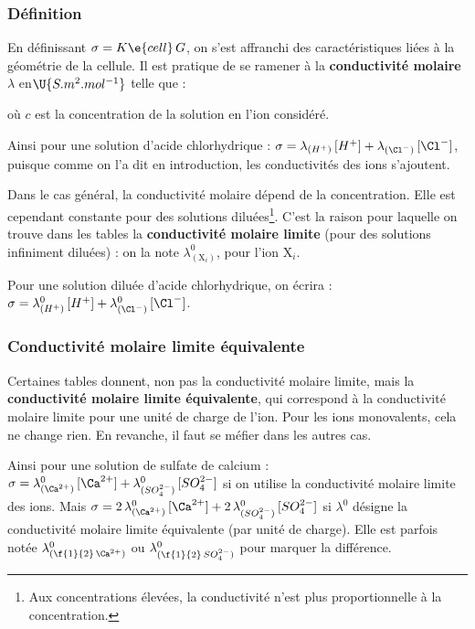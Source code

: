 \documentclass{tp}
\begin{document}
\subsubsection{Définition}

\indent En définissant $\sigma = K\e{cell} \, G$, on s'est affranchi des caractéristiques liées à la géométrie de la cellule. Il est pratique de
se ramener à la \textbf{conductivité molaire} $\lambda$ en$\U{S.m^2.mol^{-1}}$ telle que :

\noindent où $c$ est la concentration de la solution en l'ion considéré.

\medskip

\indent Ainsi pour une solution d'acide chlorhydrique : $\sigma = \lambda_{(H^+)} \, [H^+] + \lambda_{(\Cl^-)} \, [\Cl^-]$, puisque comme on l'a dit en introduction, les conductivités des ions s'ajoutent.

\medskip

\indent Dans le cas général, la conductivité molaire dépend de la concentration. Elle est cependant constante pour des solutions diluées\footnote{Aux
concentrations élevées, la conductivité n'est plus proportionnelle à la concentration.}. C'est la raison pour laquelle on trouve dans les tables la \textbf{conductivité molaire limite} (pour des solutions infiniment diluées) : on la note $\lambda^0_{(\text{X}_i)}$, pour l'ion X$_i$.

\medskip

\indent Pour une solution diluée d'acide chlorhydrique, on écrira : $\sigma = \lambda^0_{(H^+)} \, [H^+] + \lambda^0_{(\Cl^-)} \, [\Cl^-]$.

\vspace{-0.4cm}

\subsubsection{Conductivité molaire limite équivalente}

\indent Certaines tables donnent, non pas la conductivité molaire limite, mais la \textbf{conductivité molaire limite équivalente}, qui correspond à la conductivité molaire limite pour une unité de charge de l'ion. Pour les ions monovalents, cela ne change rien. En revanche, il faut se méfier dans les autres cas.

\indent Ainsi pour une solution de sulfate de calcium : $\sigma = \lambda^0_{(\Ca^{2+})} \, [\Ca^{2+}] + \lambda^0_{(SO_4^{2-})} \, [SO_4^{2-}]$ si on utilise la conductivité molaire limite des ions. Mais $\sigma = 2 \, \lambda^0_{(\Ca^{2+})} \, [\Ca^{2+}] + 2 \, \lambda^0_{(SO_4^{2-})} \, [SO_4^{2-}]$ si $\lambda^0$ désigne la conductivité molaire limite équivalente (\ie par unité de charge). Elle est parfois notée $\lambda^0_{(\f{1}{2}\,\Ca^{2+})}$ ou $\lambda^0_{(\f{1}{2}\,SO_4^{2-})}$ pour marquer la différence.
\end{document}
